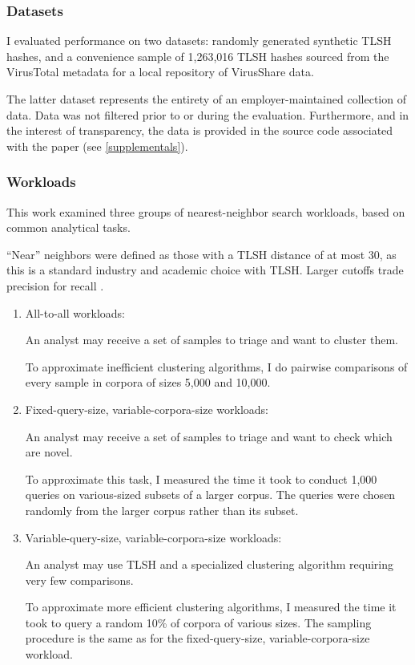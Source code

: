 \documentclass[5p,final]{elsarticle}
\begin{document}
\subsubsection{Datasets}
I evaluated performance on two datasets: randomly generated synthetic TLSH
hashes, and a convenience sample of 1,263,016 TLSH hashes sourced from the
VirusTotal metadata for a local repository of VirusShare
\cite{VirusSharecom2024} data.

The latter dataset represents the entirety of an employer-maintained
collection of data. Data was not filtered prior to or during the
evaluation. Furthermore, and in the interest of transparency, the
data is provided in the source code associated with the paper
(see \ref{supplementals}).

\subsubsection{Workloads}
This work examined three groups of nearest-neighbor search workloads,
based on common analytical tasks.

\enquote{Near} neighbors were defined as those with a TLSH distance
of at most 30, as this is a standard industry and academic choice
\cite{hutelmyerImplementingTLSHBased2024,joyceAVScan2VecFeatureLearning2023}
with TLSH. Larger cutoffs trade precision for recall
\cite{oliverTLSHLocalitySensitive2013}.

\begin{enumerate}
	\item All-to-all workloads:

		An analyst may receive a set of samples to triage and want to cluster them.

		To approximate inefficient clustering algorithms, I do pairwise
		comparisons of every sample in corpora of sizes 5,000 and 10,000.

	\item Fixed-query-size, variable-corpora-size workloads:

		An analyst may receive a set of samples to triage and want to check
		which are novel.

		To approximate this task, I measured the time it took to conduct
		1,000 queries on various-sized subsets of a larger corpus. The
		queries were chosen randomly from the larger corpus rather than its subset.

	\item Variable-query-size, variable-corpora-size workloads:

		An analyst may use TLSH and a specialized clustering algorithm
		requiring very few comparisons.

		To approximate more efficient clustering algorithms, I measured
		the time it took to query a random 10\% of corpora of various
		sizes. The sampling procedure is the same as for the
		fixed-query-size, variable-corpora-size workload.

\end{enumerate}
\end{document}
